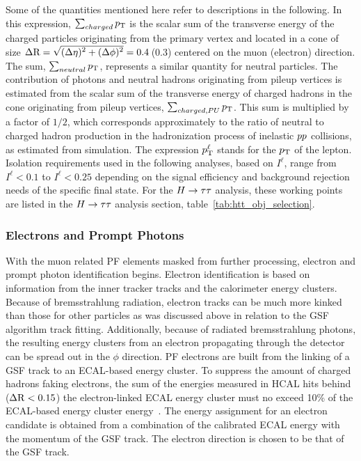 Some of the quantities mentioned here refer to descriptions in the following.
In this expression, $\sum_{charged}  p_\mathrm{T}$ is the scalar sum of the transverse energy of the 
charged particles originating from the primary vertex and located in a cone of size
$\Delta \mathrm{R} = \sqrt{\smash[b]{(\Delta \eta)^2 + (\Delta \phi)^2}} = 0.4$\,(0.3)
centered on the muon (electron) direction. The sum, $\sum_{neutral}  p_\mathrm{T}$, represents
a similar quantity for neutral particles. The contribution of photons and neutral hadrons 
originating from pileup vertices is estimated from the scalar sum of the transverse
energy of charged hadrons in the cone originating from pileup vertices,
$\sum_{charged, PU} p_\mathrm{T}$. This sum is multiplied by a factor of $1/2$, which corresponds 
approximately to the ratio of neutral to charged hadron production in the hadronization process
of inelastic $pp$ collisions, as estimated from simulation. The expression $p_\mathrm{T}^{\ell}$ 
stands for the $p_\mathrm{T}$ of the lepton. Isolation requirements used in the following analyses, 
based on $I^{\ell}$, range from $I^{\ell} < 0.1$ to $I^{\ell} < 0.25$ depending on the signal efficiency and
background rejection needs of the specific final state. For the $H\to\tau\tau$ analysis, these
working points are listed in the $H\to\tau\tau$ analysis section, table~\ref{tab:htt_obj_selection}.




\subsubsection{Electrons and Prompt Photons}
With the muon related PF elements masked from further processing, electron and prompt photon
identification begins.
Electron identification is based on information from the inner tracker tracks and the calorimeter
energy clusters. Because of bremsstrahlung radiation, electron tracks can be much more kinked
than those for other particles as was discussed above in relation to the GSF algorithm track
fitting. Additionally, because of radiated bremsstrahlung photons, the resulting energy clusters 
from an electron propagating through the detector can be spread out in the
$\phi$ direction. PF electrons are built from the linking of a GSF track to an
ECAL-based energy cluster. To suppress the amount of charged hadrons faking electrons, the 
sum of the energies measured in HCAL hits behind ($\Delta \mathrm{R} < 0.15$) 
the electron-linked ECAL energy cluster must no exceed 10\% of the ECAL-based 
energy cluster energy~\cite{Sirunyan:2017ulk}. The energy assignment for an electron candidate is obtained from a 
combination of the calibrated ECAL energy with the momentum of the GSF track. The electron 
direction is chosen to be that of the GSF track.

